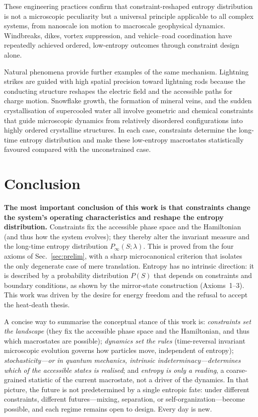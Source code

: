 \documentclass[11pt,a4paper]{article}
\begin{document}
These engineering practices confirm that constraint-reshaped entropy
distribution is not a microscopic peculiarity but a universal principle
applicable to all complex systems, from nanoscale ion motion to macroscale
geophysical dynamics. Windbreaks, dikes, vortex suppression, and
vehicle--road coordination have repeatedly achieved ordered, low-entropy
outcomes through constraint design alone.

Natural phenomena provide further examples of the same mechanism. Lightning
strikes are guided with high spatial precision toward lightning rods because
the conducting structure reshapes the electric field and the accessible
paths for charge motion. Snowflake growth, the formation of mineral veins,
and the sudden crystallisation of supercooled water all involve geometric
and chemical constraints that guide microscopic dynamics from relatively
disordered configurations into highly ordered crystalline structures. In
each case, constraints determine the long-time entropy distribution and make
these low-entropy macrostates statistically favoured compared with the
unconstrained case.

\section{Conclusion}

\textbf{The most important conclusion of this work is that constraints change the
system's operating characteristics and reshape the entropy distribution.}
Constraints fix the accessible phase space and the Hamiltonian (and thus how the
system evolves); they thereby alter the invariant measure and the
long-time entropy distribution $P_{\infty}(S;\lambda)$. This is proved from the
four axioms of Sec.~\ref{sec:prelim}, with a sharp microcanonical criterion that
isolates the only degenerate case of mere translation. Entropy has no intrinsic
direction: it is described by a probability distribution $P(S)$ that depends on
constraints and boundary conditions, as shown by the mirror-state construction
(Axioms~1--3). This work was driven by the desire for energy freedom and the
refusal to accept the heat-death thesis.

A concise way to summarise the conceptual stance of this work is: \emph{constraints
set the landscape} (they fix the accessible phase space and the Hamiltonian, and thus
which macrostates are possible); \emph{dynamics set the rules} (time-reversal invariant
microscopic evolution governs how particles move, independent of entropy);
\emph{stochasticity---or in quantum mechanics, intrinsic indeterminacy---determines
which of the accessible states is realised}; and \emph{entropy is only a reading}, a
coarse-grained statistic of the current macrostate, not a driver of the dynamics. In
that picture, the future is not predetermined by a single entropic fate: under different
constraints, different futures---mixing, separation, or self-organization---become
possible, and each regime remains open to design. Every day is new.
\end{document}
